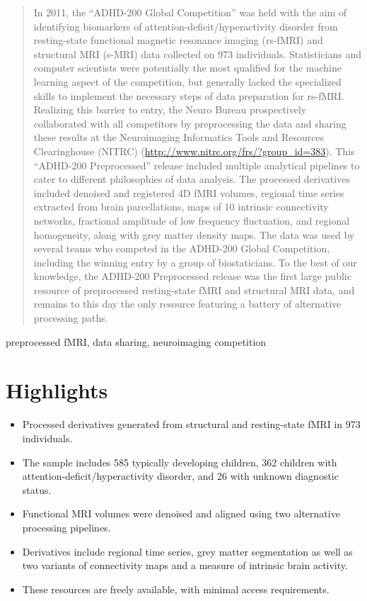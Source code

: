 \documentclass[preprint,12pt,3p]{elsarticle}
\begin{document}
\begin{frontmatter}
\begin{abstract}
In 2011, the ``ADHD-200 Global Competition'' was held with the aim of identifying biomarkers of attention-deficit/hyperactivity disorder from resting-state functional magnetic resonance imaging (rs-fMRI) and structural MRI (s-MRI) data collected on 973 individuals. Statisticians and computer scientists were potentially the most qualified for the machine learning aspect of the competition, but generally lacked the specialized skills to implement the necessary steps of data preparation for rs-fMRI. Realizing this barrier to entry, the Neuro Bureau prospectively collaborated with all competitors by preprocessing the data and sharing these results at the Neuroimaging Informatics Tools and Resources Clearinghouse (NITRC) (\url{http://www.nitrc.org/frs/?group_id=383}). This ``ADHD-200 Preprocessed'' release included multiple analytical pipelines to cater to different philosophies of data analysis. The processed derivatives included denoised and registered 4D fMRI volumes, regional time series extracted from brain parcellations, maps of 10 intrinsic connectivity networks, fractional amplitude of low frequency fluctuation, and regional homogeneity, along with grey matter density maps. The data was used by several teams who competed in the ADHD-200 Global Competition, including the winning entry by a group of biostaticians. To the best of our knowledge, the ADHD-200 Preprocessed release was the first large public resource of preprocessed resting-state fMRI and structural MRI data, and remains to this day the only resource featuring a battery of alternative processing paths. 
\end{abstract}

\begin{keyword}
preprocessed fMRI, data sharing, neuroimaging competition
\end{keyword}

\end{frontmatter}

\section*{Highlights}
\begin{itemize}
\item Processed derivatives generated from structural and resting-state fMRI in 973 individuals. 
\item The sample includes 585 typically developing children, 362 children with attention-deficit/hyperactivity disorder, and 26 with unknown diagnostic status.
\item Functional MRI volumes were denoised and aligned using two alternative processing pipelines. 
\item Derivatives include regional time series, grey matter segmentation as well as two variants of connectivity maps and a measure of intrinsic brain activity. 
\item These resources are freely available, with minimal access requirements. 
\end{itemize}
\end{document}
